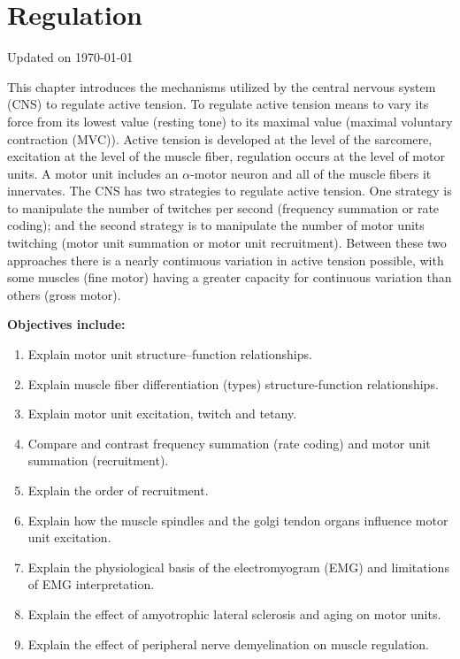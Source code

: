 \chapter{Regulation}\label{chp:regulation}
Updated on \today
\minitoc

This chapter introduces the mechanisms utilized by the central nervous system (CNS) to regulate active tension. To regulate active tension means to vary its force from its lowest value (resting tone) to its maximal value (maximal voluntary contraction (MVC)). Active tension is developed at the level of the sarcomere, excitation at the level of the muscle fiber, regulation occurs at the level of motor units. A motor unit includes an $\alpha$-motor neuron and all of the muscle fibers it innervates. The CNS has two strategies to regulate active tension. One strategy is to manipulate the number of twitches per second (frequency summation or rate coding); and the second strategy is to manipulate the number of motor units twitching (motor unit summation or motor unit recruitment). Between these two approaches there is a nearly continuous variation in active tension possible, with some muscles (fine motor) having a greater capacity for continuous variation than others (gross motor).

\vspace{5mm}

\textbf{Objectives include:}
\begin{enumerate}
    \item Explain motor unit structure–function relationships.
    \item Explain muscle fiber differentiation (types) structure-function relationships.
    \item Explain motor unit excitation, twitch and tetany.
    \item Compare and contrast frequency summation (rate coding) and motor unit summation (recruitment).
    \item Explain the order of recruitment.
    \item Explain how the muscle spindles and the golgi tendon organs influence motor unit excitation.
    \item Explain the physiological basis of the electromyogram (EMG) and limitations of EMG interpretation.
    \item Explain the effect of amyotrophic lateral sclerosis and aging on motor units.
    \item Explain the effect of peripheral nerve demyelination on muscle regulation.
\end{enumerate}\

